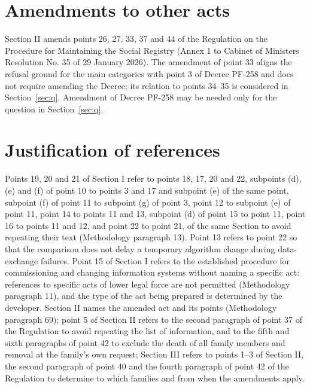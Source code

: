 \documentclass[14pt,a4paper]{extarticle}
\begin{document}
\section{Amendments to other acts}
Section II amends points 26, 27, 33, 37 and 44 of the Regulation on the Procedure for Maintaining the Social Registry (Annex 1 to Cabinet of Ministers Resolution No. 35 of 29 January 2026). The amendment of point 33 aligns the refusal ground for the main categories with point 3 of Decree PF-258 and does not require amending the Decree; its relation to points 34–35 is considered in Section~\ref{sec:q}. Amendment of Decree PF-258 may be needed only for the question in Section~\ref{sec:q}.

\section{Justification of references}
Points 19, 20 and 21 of Section I refer to points 18, 17, 20 and 22, subpoints (d), (e) and (f) of point 10 to points 3 and 17 and subpoint (e) of the same point, subpoint (f) of point 11 to subpoint (g) of point 3, point 12 to subpoint (e) of point 11, point 14 to points 11 and 13, subpoint (d) of point 15 to point 11, point 16 to points 11 and 12, and point 22 to point 21, of the same Section to avoid repeating their text (Methodology paragraph 13). Point 13 refers to point 22 so that the comparison does not delay a temporary algorithm change during data-exchange failures. Point 15 of Section I refers to the established procedure for commissioning and changing information systems without naming a specific act: references to specific acts of lower legal force are not permitted (Methodology paragraph 11), and the type of the act being prepared is determined by the developer. Section II names the amended act and its points (Methodology paragraph 69); point 5 of Section II refers to the second paragraph of point 37 of the Regulation to avoid repeating the list of information, and to the fifth and sixth paragraphs of point 42 to exclude the death of all family members and removal at the family’s own request; Section III refers to points 1–3 of Section II, the second paragraph of point 40 and the fourth paragraph of point 42 of the Regulation to determine to which families and from when the amendments apply.
\end{document}
